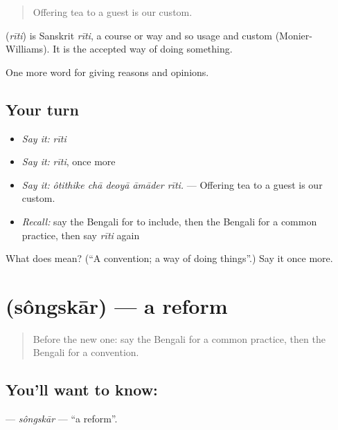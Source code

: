\begin{quote}
Offering tea to a guest is our custom.
\end{quote}

\begin{cousinweb}
\textbf{} (\emph{rīti}) is Sanskrit \emph{rīti}, a course or way and so usage and custom (Monier-Williams). It is the accepted way of doing something.
\end{cousinweb}

\begin{grammarlens}[title={What you've built}]
One more word for giving reasons and opinions.
\end{grammarlens}

\subsection*{Your turn}
\begin{itemize}
\raggedright
  \item \emph{Say it:} \emph{rīti}
  \item \emph{Say it:} \emph{rīti}, once more
  \item \emph{Say it:} \emph{ôtithike chā deoyā āmāder rīti.} — Offering tea to a guest is our custom.
  \item \emph{Recall:} say the Bengali for to include, then the Bengali for a common practice, then say \emph{rīti} again
\end{itemize}

\begin{tcolorbox}[breakable,colback=teal!4,colframe=teal!35!black,title={Before you move on}]
What does  mean? (\textquotedblleft{}A convention; a way of doing things\textquotedblright{}.) Say it once more.
\end{tcolorbox}
\section[\texorpdfstring{\bn{সংস্কার} (sôngskār)}{সংস্কার (sôngskār)}]{ (sôngskār) — a reform}

\label{lesson:BN-C353-songskar}



\begin{quote}
Before the new one: say the Bengali for a common practice, then the Bengali for a convention.
\end{quote}

\subsection*{You'll want to know: }
\textbf{} — \emph{sôngskār} — \textquotedblleft{}a reform\textquotedblright{}.

